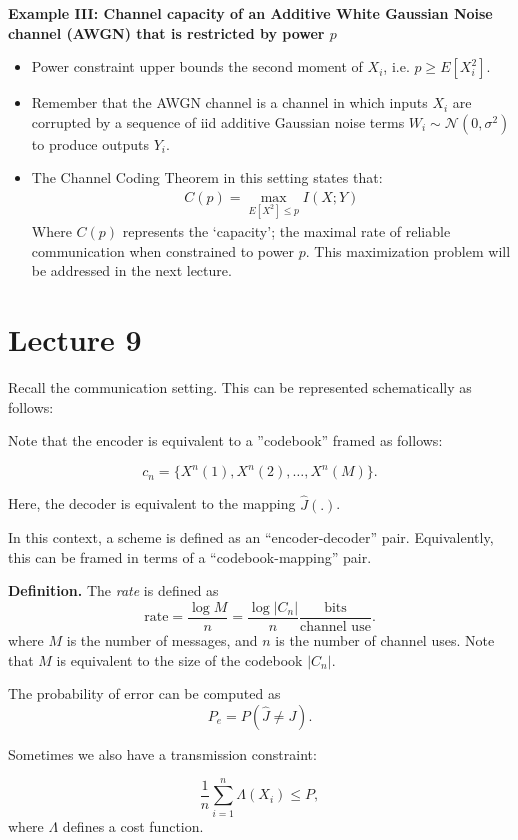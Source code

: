 \documentclass[13pt]{article}
\newcommand{\eq}[1]{\begin{align*}#1\end{align*}}
\begin{document}
\noindent\textbf{Example III:  Channel capacity of an Additive White Gaussian Noise channel (AWGN) that is restricted by power $p$}
\begin{itemize}
\item Power constraint upper bounds the second moment of $X_i$, i.e. $p \geq E\left[ X_i^2\right]$.
\item Remember that the AWGN channel is a channel in which inputs $X_i$ are corrupted by a sequence of iid additive Gaussian noise terms $W_i \sim \mathcal{N}(0, \sigma^2)$ to produce outputs $Y_i$.
\item The Channel Coding Theorem in this setting states that:
\eq{
C(p) = \max_{E[X^2] \leq p} I(X ; Y)
}
Where $C(p)$ represents the `capacity'; the maximal rate of reliable communication when constrained to power $p$.  This maximization problem will be addressed in the next lecture.

\end{itemize}

\section{Lecture 9}

Recall the communication setting.  This can be represented schematically as follows:


Note that the encoder is equivalent to a ''codebook'' framed as follows:

\[
  c_n = \{ X^n (1), X^n (2), \dots, X^n (M) \}.
\]

Here, the decoder is equivalent to the mapping $\hat{J}(.)$.

In this context, a scheme is defined as an ``encoder-decoder'' pair.  Equivalently, this can be framed in terms of a ``codebook-mapping'' pair.

{\bf Definition.} The {\it rate} is defined as
\[
  \text{rate} = \frac{\log M}{n} = \frac{\log |C_n|}{n} \frac{\text{bits}}{\text{channel use}}.
\]
where $M$ is the number of messages, and $n$ is the number of channel uses.  Note that $M$ is equivalent to the size of the codebook $|C_n|$.

The probability of error can be computed as
\[
  P_e = P(\hat{J} \neq J).
\]

Sometimes we also have a transmission constraint:

\[
  \frac{1}{n} \sum_{i=1}^{n} \Lambda (X_i) \leq P,
\]
where $\Lambda$ defines a cost function.  
\end{document}
